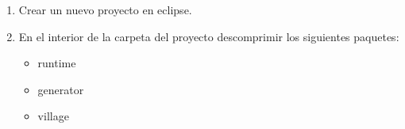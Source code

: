 \begin{enumerate}
	\item Crear un nuevo proyecto en eclipse.
	\item En el interior de la carpeta del proyecto descomprimir los siguientes paquetes:
	\begin{itemize}
		\item runtime
		\item generator
		\item village
	\end{itemize}
\end{enumerate}